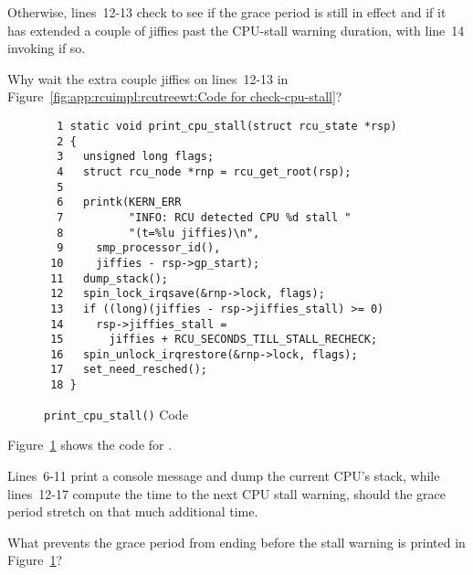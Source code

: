 Otherwise, lines~12-13 check to see if the grace period is still in effect
and if it has extended a couple of jiffies past the CPU-stall warning
duration, with line~14 invoking  if so.

\QuickQuiz{}
	Why wait the extra couple jiffies on lines~12-13 in
	Figure~\ref{fig:app:rcuimpl:rcutreewt:Code for check-cpu-stall}?
 \QuickQuizEnd

\begin{figure}[tbp]
{ \scriptsize
\begin{verbatim}
  1 static void print_cpu_stall(struct rcu_state *rsp)
  2 {
  3   unsigned long flags;
  4   struct rcu_node *rnp = rcu_get_root(rsp);
  5
  6   printk(KERN_ERR
  7          "INFO: RCU detected CPU %d stall "
  8          "(t=%lu jiffies)\n",
  9     smp_processor_id(),
 10     jiffies - rsp->gp_start);
 11   dump_stack();
 12   spin_lock_irqsave(&rnp->lock, flags);
 13   if ((long)(jiffies - rsp->jiffies_stall) >= 0)
 14     rsp->jiffies_stall =
 15       jiffies + RCU_SECONDS_TILL_STALL_RECHECK;
 16   spin_unlock_irqrestore(&rnp->lock, flags);
 17   set_need_resched();
 18 }
\end{verbatim}
}
\caption{{\tt print\_cpu\_stall()} Code}
\label{fig:app:rcuimpl:rcutreewt:Code for print-cpu-stall}
\end{figure}

Figure~\ref{fig:app:rcuimpl:rcutreewt:Code for print-cpu-stall}
shows the code for .

Lines~6-11 print a console message and dump the current CPU's stack,
while lines~12-17 compute the time to the next CPU stall warning, should
the grace period stretch on that much additional time.

\QuickQuiz{}
	What prevents the grace period from ending before the
	stall warning is printed in
	Figure~\ref{fig:app:rcuimpl:rcutreewt:Code for print-cpu-stall}?
 \QuickQuizEnd

